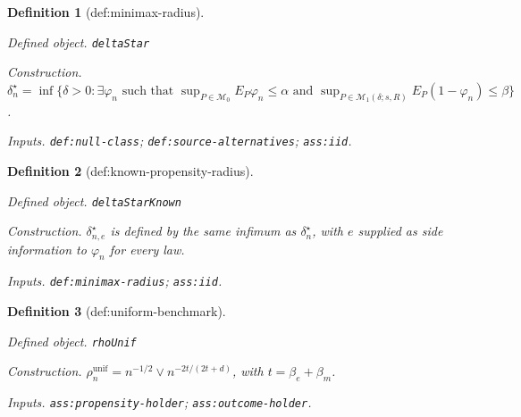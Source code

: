 \documentclass{article}
\newtheorem{definition}{Definition}
\begin{document}
\begin{definition}[def:minimax-radius]\label{def:minimax-radius}
\par\smallskip\noindent\emph{Defined object.} \texttt{deltaStar}
\par\smallskip\noindent\emph{Construction.} \(\delta_n^\star=\inf\{\delta>0:\exists\varphi_n\text{ such that }\sup_{P\in\mathcal M_0}E_P\varphi_n\le\alpha\text{ and }\sup_{P\in\mathcal M_1(\delta;s,R)}E_P(1-\varphi_n)\le\beta\}\).
\par\smallskip\noindent\emph{Inputs.} \texttt{def:\allowbreak{}null-\allowbreak{}class}; \texttt{def:\allowbreak{}source-\allowbreak{}alternatives}; \texttt{ass:\allowbreak{}iid}.
\end{definition}

\begin{definition}[def:known-propensity-radius]\label{def:known-propensity-radius}
\par\smallskip\noindent\emph{Defined object.} \texttt{deltaStarKnown}
\par\smallskip\noindent\emph{Construction.} \(\delta_{n,e}^\star\) is defined by the same infimum as \(\delta_n^\star\), with \(e\) supplied as side information to \(\varphi_n\) for every law.
\par\smallskip\noindent\emph{Inputs.} \texttt{def:\allowbreak{}minimax-\allowbreak{}radius}; \texttt{ass:\allowbreak{}iid}.
\end{definition}

\begin{definition}[def:uniform-benchmark]\label{def:uniform-benchmark}
\par\smallskip\noindent\emph{Defined object.} \texttt{rhoUnif}
\par\smallskip\noindent\emph{Construction.} \(\rho_n^{\mathrm{unif}}=n^{-1/2}\vee n^{-2t/(2t+d)}\), with \(t=\beta_e+\beta_m\).
\par\smallskip\noindent\emph{Inputs.} \texttt{ass:\allowbreak{}propensity-\allowbreak{}holder}; \texttt{ass:\allowbreak{}outcome-\allowbreak{}holder}.
\end{definition}
\end{document}
